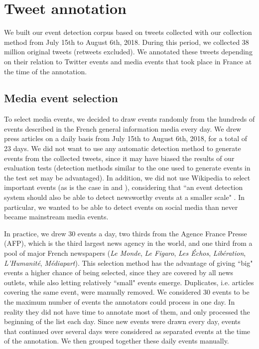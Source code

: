 \section{Tweet annotation}

We built our event detection corpus based on tweets collected with our collection method from July 15th to August 6th, 2018. During this period, we collected 38 million original tweets (retweets excluded). We annotated these tweets depending on their relation to  Twitter events and media events that took place in France at the time of the annotation.
	
	\subsection{Media event selection}
	To select media events, we decided to draw events randomly
from the hundreds of events described in the French general information media every day.
    We drew press articles on a daily basis from July 15th to August 6th, 2018, for a total of 23 days.
    We did not want to use any automatic detection method to generate events from the collected tweets, since it may have
    biased the results of our evaluation tests (detection methods similar to the one used to generate events in the test
set may be advantaged). In addition, we did not use Wikipedia to select important events (as is the case in
\citet{mcminn_building_2013} and \citet{petrovic_using_2012}), considering that ``an event detection system should also
be able to detect newsworthy events at a smaller scale" \citep{hasan_survey_2018}.
In particular, we wanted to be able to detect events on social media than never became mainstream media events.

In practice, we drew 30 events a day, two thirds from the Agence France Presse (AFP), which is the third largest news
agency in the world, and one third from a pool of major French  newspapers (\textit{Le Monde}, \textit{Le Figaro},
\textit{Les Échos}, \textit{Libération}, \textit{L'Humanité}, \textit{Médiapart}). This selection method has the
advantage of giving ``big" events a higher chance of being selected, since they are covered by all news outlets, while
also letting relatively ``small" events emerge. Duplicates, i.e. articles covering the same event, were
manually removed. We considered 30 events to be the maximum number of events the annotators could process in one day. In
reality they did not have time to annotate most of them, and only processed the beginning of the list each day.
Since new events were drawn every day, events that continued over several days were considered as separated events at
the time of the annotation. We then grouped together these daily events manually.

